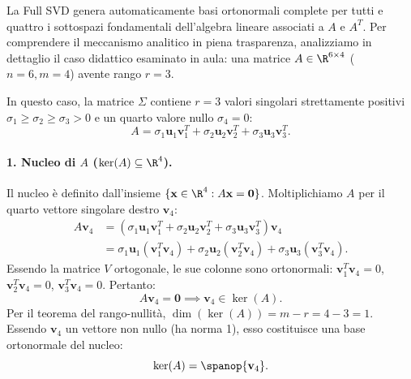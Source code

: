 La Full SVD genera automaticamente basi ortonormali complete per tutti e quattro i sottospazi fondamentali dell'algebra lineare associati a $A$ e $A^T$.
Per comprendere il meccanismo analitico in piena trasparenza, analizziamo in dettaglio il caso didattico esaminato in aula: una matrice $A \in \R^{6 \times 4}$ ($n = 6, m = 4$) avente rango $r = 3$.

In questo caso, la matrice $\Sigma$ contiene $r = 3$ valori singolari strettamente positivi $\sigma_1 \ge \sigma_2 \ge \sigma_3 > 0$ e un quarto valore nullo $\sigma_4 = 0$:
\begin{equation}
    A = \sigma_1 \mathbf{u}_1 \mathbf{v}_1^T + \sigma_2 \mathbf{u}_2 \mathbf{v}_2^T + \sigma_3 \mathbf{u}_3 \mathbf{v}_3^T.
\end{equation}

\paragraph{1. Nucleo di $A$ ($\ker(A) \subseteq \R^4$).}
Il nucleo \`e definito dall'insieme $\{\mathbf{x} \in \R^4 : A\mathbf{x} = \mathbf{0}\}$. Moltiplichiamo $A$ per il quarto vettore singolare destro $\mathbf{v}_4$:
\begin{align}
    A \mathbf{v}_4 &= \left( \sigma_1 \mathbf{u}_1 \mathbf{v}_1^T + \sigma_2 \mathbf{u}_2 \mathbf{v}_2^T + \sigma_3 \mathbf{u}_3 \mathbf{v}_3^T \right) \mathbf{v}_4 \nonumber \\
                   &= \sigma_1 \mathbf{u}_1 (\mathbf{v}_1^T \mathbf{v}_4) + \sigma_2 \mathbf{u}_2 (\mathbf{v}_2^T \mathbf{v}_4) + \sigma_3 \mathbf{u}_3 (\mathbf{v}_3^T \mathbf{v}_4).
\end{align}
Essendo la matrice $V$ ortogonale, le sue colonne sono ortonormali: $\mathbf{v}_1^T \mathbf{v}_4 = 0$, $\mathbf{v}_2^T \mathbf{v}_4 = 0$, $\mathbf{v}_3^T \mathbf{v}_4 = 0$. Pertanto:
\begin{equation}
    A \mathbf{v}_4 = \mathbf{0} \implies \mathbf{v}_4 \in \ker(A).
\end{equation}
Per il teorema del rango-nullit\`a, $\dim(\ker(A)) = m - r = 4 - 3 = 1$. Essendo $\mathbf{v}_4$ un vettore non nullo (ha norma 1), esso costituisce una base ortonormale del nucleo:
\begin{equation}
    \ker(A) = \spanop\{\mathbf{v}_4\}.
\end{equation}

